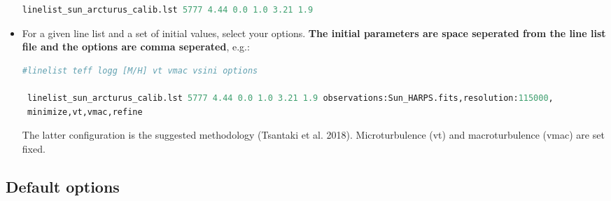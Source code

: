 \documentclass[a4paper,12pt]{article}
\begin{document}
\begin{itemize}
\begin{lstlisting}[language=Python]
 linelist_sun_arcturus_calib.lst 5777 4.44 0.0 1.0 3.21 1.9
\end{lstlisting}

 \item For a given line list and a set of initial values, select your options. {\bf The initial parameters are space seperated from the line list file and the options are comma seperated}, e.g.:
 {\tiny
 \begin{lstlisting}[language=Python]
 #linelist teff logg [M/H] vt vmac vsini options

 linelist_sun_arcturus_calib.lst 5777 4.44 0.0 1.0 3.21 1.9 observations:Sun_HARPS.fits,resolution:115000,
 minimize,vt,vmac,refine
\end{lstlisting} }
The latter configuration is the suggested methodology (Tsantaki et al. 2018). Microturbulence (vt) and macroturbulence (vmac) are set fixed. 

\end{itemize}


\subsection{Default options}
\end{document}
